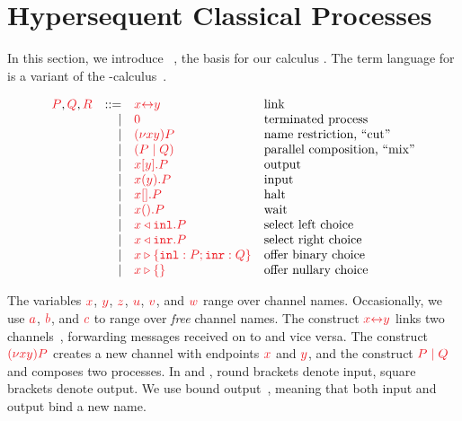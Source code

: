 \documentclass[envcountsame,UKenglish]{llncs}
\begin{document}
\section{Hypersequent Classical Processes}\label{sec:cp-revisited}
In this section, we introduce \dhcp~\cite{kokke2018tlla,kokke2019pacmpl}, the basis for our calculus \nodcap. 
%
The term language for \hcp is a variant of the \textpi-calculus~\cite{milner1992b}.
\begin{definition}[Terms]\label{def:hcp-terms}
  \[
    \begin{array}{lrll}
      \tm{P}, \tm{Q}, \tm{R}
        & ::=& \tm{\cpLink{x}{y}}    &\text{link}
      \\&\mid& \tm{\piHalt}          &\text{terminated process}
      \\&\mid& \tm{\piNew{x}{y}{P}}  &\text{name restriction, ``cut''}
      \\&\mid& \tm{( \piPar{P}{Q} )} &\text{parallel composition, ``mix''}
      \\&\mid& \tm{\piSend{x}{y}{P}} &\text{output}
      \\&\mid& \tm{\piRecv{x}{y}{P}} &\text{input}
      \\&\mid& \tm{\piSend{x}{}{P}}  &\text{halt}
      \\&\mid& \tm{\cpWait{x}{}{P}}  &\text{wait}
      \\&\mid& \tm{\cpInl{x}{P}}     &\text{select left choice}
      \\&\mid& \tm{\cpInr{x}{P}}     &\text{select right choice}
      \\&\mid& \tm{\cpCase{x}{P}{Q}} &\text{offer binary choice}
      \\&\mid& \tm{\cpAbsurd{x}}     &\text{offer nullary choice}
    \end{array}
  \]
\end{definition}\noindent
The variables $\tm{x}$, $\tm{y}$, $\tm{z}$, $\tm{u}$, $\tm{v}$, and $\tm{w}$ range over channel names. Occasionally, we use $\tm{a}$, $\tm{b}$, and $\tm{c}$ to range over \emph{free} channel names. The construct $\tm{\cpLink{x}{y}}$ links two channels~\cite{sangiorgi1996,boreale1998}, forwarding messages received on  to  and vice versa. The construct $\tm{\piNew{x}{y}{P}}$ creates a new channel with endpoints $\tm{x}$ and $\tm{y}$, and the construct $\tm{\piPar{P}{Q}}$ and composes two processes. In  and , round brackets denote input, square brackets denote output. We use bound output~\cite{sangiorgi1996}, meaning that both input and output bind a new name. 
\end{document}

